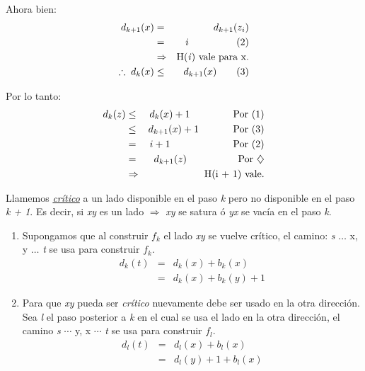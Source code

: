 \documentclass[12pt,a4paper]{report}
\begin{document}
\begin{enumerate}
        				\par Ahora bien:
        				\begin{eqnarray}
        					\nonumber d_{k + 1}(x) &=& d_{k + 1}(z_{i}) \\
        					\nonumber &=& i \qquad \qquad \; \; \; (2) \\
        					\nonumber &\Rightarrow & \textup{H(\textit{i}) vale para x.} \\
        					\nonumber \therefore \; d_{k}(x) & \leq & d_{k + 1}(x) \qquad (3)
        				\end{eqnarray}

        				\par Por lo tanto:
        				\begin{eqnarray}
        					\nonumber d_{k}(z) &\leq & d_{k}(x) + 1 \qquad \qquad \textup{ Por } (1) \\
        					\nonumber &\leq & d_{k + 1}(x) + 1 \qquad \; \; \; \; \textup{ Por (3)} \\
        					\nonumber &=& i + 1 \qquad \qquad \qquad \textup{ Por } (2) \\
        					\nonumber &=& d_{k + 1}(z) \qquad \qquad \; \; \; \textup{ Por } \diamondsuit \\
        					\nonumber & \Rightarrow & \textup{H(i + 1) vale.}
        				\end{eqnarray}
        			\end{enumerate}

  			\par Llamemos \textit{\underline{crítico}} a un lado disponible en el paso \textit{k} pero no disponible en el paso \textit{k + 1}. Es decir, si \textit{xy} es un lado $\Rightarrow$ \textit{xy} se satura ó \textit{yx} se vacía en el paso \textit{k}.
  			\begin{enumerate}
  				\item Supongamos que al construir $f_{k}$ el lado \textit{xy} se vuelve crítico, el camino: \textit{s} $\dotsc$ x, y $\dotsc$ \textit{t} se usa para construir $f_{k}$.
  				\begin{eqnarray}
  					\nonumber d_{k}(\textit{t}) &=& d_{k}(x) + b_{k}(x) \\
  					\nonumber &=& d_{k}(x) + b_{k}(y) + 1
  				\end{eqnarray}

  				\item Para que \textit{xy} pueda ser \textit{crítico} nuevamente debe ser usado en la otra dirección. Sea \textit{l} el paso posterior a \textit{k} en el cual se usa el lado en la otra dirección, el camino \textit{s} $\dotsb$ y, x $\dotsb$ \textit{t} se usa para construir $f_{l}$.
  				\begin{eqnarray}
  					\nonumber d_{l}(t) &=& d_{l}(x) + b_{l}(x) \\
  					\nonumber &=& d_{l}(y) + 1 + b_{l}(x)
  				\end{eqnarray}
  			\end{enumerate}
\end{document}
